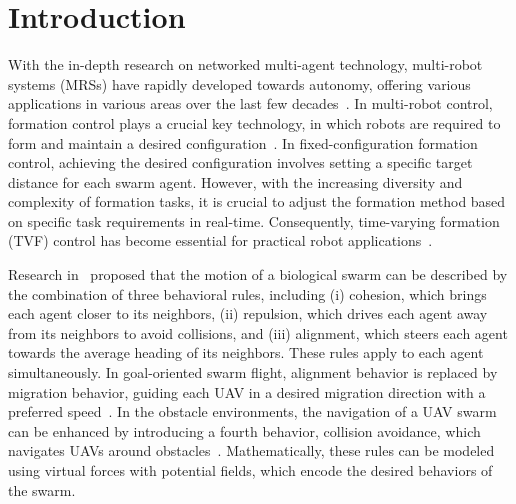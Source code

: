\section{Introduction}

With the in-depth research on networked multi-agent technology, multi-robot systems (MRSs) have rapidly developed towards autonomy, offering various applications in various areas over the last few decades~\cite {6303906,1335496}. In multi-robot control, formation control plays a crucial key technology, in which robots are required to form and maintain a desired configuration~\cite{1545539,Oh2015}. In fixed-configuration formation control, achieving the desired configuration involves setting a specific target distance for each swarm agent. However, with the increasing diversity and complexity of formation tasks, it is crucial to adjust the formation method based on specific task requirements in real-time. Consequently, time-varying formation (TVF) control has become essential for practical robot applications~\cite{Dong2015,Dong2016}.

Research in~\cite{736776,Reynolds1987,Antonelli2009} proposed that the motion of a biological swarm can be described by the combination of three behavioral rules, including (i) cohesion, which brings each agent closer to its neighbors, (ii) repulsion, which drives each agent away from its neighbors to avoid collisions, and (iii) alignment, which steers each agent towards the average heading of its neighbors. These rules apply to each agent simultaneously. In goal-oriented swarm flight, alignment behavior is replaced by migration behavior, guiding each UAV in a desired migration direction with a preferred speed~\cite{6095129}. In the obstacle environments, the navigation of a UAV swarm can be enhanced by introducing a fourth behavior, collision avoidance, which navigates UAVs around obstacles~\cite{9565893,9990164,1605401,10417519}. Mathematically, these rules can be modeled using virtual forces with potential fields, which encode the desired behaviors of the swarm.

